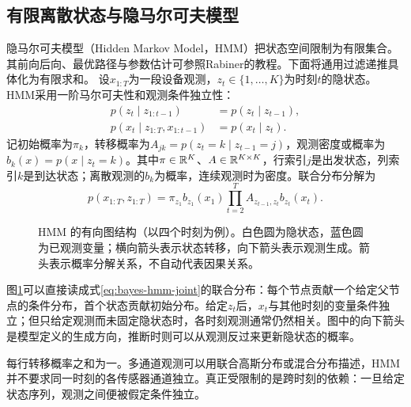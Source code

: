 \subsection{有限离散状态与隐马尔可夫模型}
隐马尔可夫模型（Hidden Markov Model，HMM）把状态空间限制为有限集合。其前向后向、最优路径与参数估计可参照Rabiner的教程\cite{rabiner1989hmm}。下面将通用过滤递推具体化为有限求和。
设$x_{1:T}$为一段设备观测，$z_t\in\{1,\ldots,K\}$为时刻$t$的隐状态。HMM采用一阶马尔可夫性和观测条件独立性：
\begin{align}
 p(z_t\mid z_{1:t-1})&=p(z_t\mid z_{t-1}),\\
 p(x_t\mid z_{1:T},x_{1:t-1})&=p(x_t\mid z_t).
\end{align}
记初始概率为$\pi_k$，转移概率为$A_{jk}=p(z_t=k\mid z_{t-1}=j)$，观测密度或概率为$b_k(x)=p(x\mid z_t=k)$。其中$\pi\in\mathbb{R}^K$、$A\in\mathbb{R}^{K\times K}$，行索引$j$是出发状态，列索引$k$是到达状态；离散观测的$b_k$为概率，连续观测时为密度。联合分布分解为
\begin{equation}
 p(x_{1:T},z_{1:T})=\pi_{z_1}b_{z_1}(x_1)
 \prod_{t=2}^{T}A_{z_{t-1},z_t}b_{z_t}(x_t).\label{eq:bayes-hmm-joint}
\end{equation}
\begin{figure}[htbp]
\centering
{}
\caption{HMM 的有向图结构（以四个时刻为例）。白色圆为隐状态，蓝色圆为已观测变量；横向箭头表示状态转移，向下箭头表示观测生成。箭头表示概率分解关系，不自动代表因果关系。}
\label{fig:bayes-hmm-structure}
\end{figure}
图\ref{fig:bayes-hmm-structure}可以直接读成式\eqref{eq:bayes-hmm-joint}的联合分布：每个节点贡献一个给定父节点的条件分布，首个状态贡献初始分布。给定$z_t$后，$x_t$与其他时刻的变量条件独立；但只给定观测而未固定隐状态时，各时刻观测通常仍然相关。图中的向下箭头是模型定义的生成方向，推断时则可以从观测反过来更新隐状态的概率。

每行转移概率之和为一。多通道观测可以用联合高斯分布或混合分布描述，HMM 并不要求同一时刻的各传感器通道独立。真正受限制的是跨时刻的依赖：一旦给定状态序列，观测之间便被假定条件独立。

